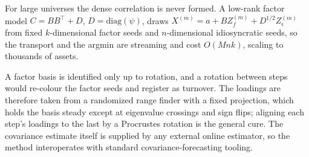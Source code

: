 For large universes the dense correlation is never formed. A low-rank factor model $C = BB^\top + D$,
$D = \mathrm{diag}(\psi)$, draws $X^{(m)} = a + B Z_f^{(m)} + D^{1/2} Z_\epsilon^{(m)}$
from fixed $k$-dimensional factor seeds and $n$-dimensional idiosyncratic seeds,
so the transport and the argmin are streaming and cost $O(Mnk)$, scaling to
thousands of assets.

A factor basis is identified only up to rotation, and a
rotation between steps would re-colour the factor seeds and register as turnover.
The loadings are therefore taken from a randomized range finder with a fixed
projection, which holds the basis steady except at eigenvalue crossings and sign
flips; aligning each step's loadings to the last by a Procrustes rotation is the
general cure. The covariance estimate itself is supplied by any external online
estimator, so the method interoperates with standard covariance-forecasting
tooling.

